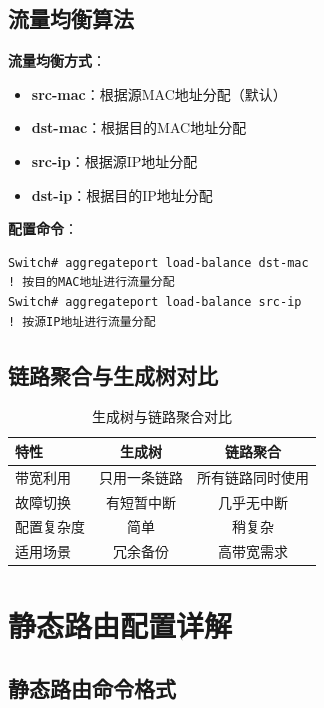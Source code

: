 \documentclass[12pt,a4paper]{ctexart}
\begin{document}
\subsection{流量均衡算法}

\begin{keybox}
\textbf{流量均衡方式}：
\begin{itemize}[itemsep=0pt]
    \item \textbf{src-mac}：根据源MAC地址分配（默认）
    \item \textbf{dst-mac}：根据目的MAC地址分配
    \item \textbf{src-ip}：根据源IP地址分配
    \item \textbf{dst-ip}：根据目的IP地址分配
\end{itemize}

\textbf{配置命令}：
\begin{lstlisting}
Switch# aggregateport load-balance dst-mac
! 按目的MAC地址进行流量分配
Switch# aggregateport load-balance src-ip
! 按源IP地址进行流量分配
\end{lstlisting}
\end{keybox}

\subsection{链路聚合与生成树对比}

\begin{table}[htbp]
\centering
\begin{tabular}{lcc}
\toprule
\textbf{特性} & \textbf{生成树} & \textbf{链路聚合} \\
\midrule
带宽利用 & 只用一条链路 & 所有链路同时使用 \\
故障切换 & 有短暂中断 & 几乎无中断 \\
配置复杂度 & 简单 & 稍复杂 \\
适用场景 & 冗余备份 & 高带宽需求 \\
\bottomrule
\end{tabular}
\caption{生成树与链路聚合对比}
\end{table}

\section{静态路由配置详解}

\subsection{静态路由命令格式}
\end{document}
